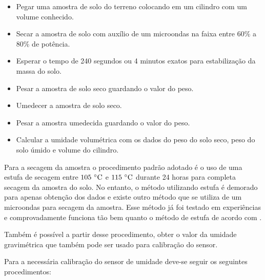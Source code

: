 		\begin{itemize}
			\item Pegar uma amostra de solo do terreno colocando em um cilindro com um volume conhecido.
			\item Secar a amostra de solo com auxílio de um microondas na faixa entre 60\% a 80\% de potência.
			\item Esperar o tempo de 240 segundos ou 4 minutos exatos para estabilização da massa do solo.
			\item Pesar a amostra de solo seco guardando o valor do peso.
			\item Umedecer a amostra de solo seco.
			\item Pesar a amostra umedecida guardando o valor do peso.
			\item Calcular a umidade volumétrica com os dados do peso do solo seco, peso do solo úmido e volume do cilindro.
		\end{itemize}

		Para a secagem da amostra o procedimento padrão adotado é o uso de uma estufa de
		secagem entre $105~\celsius$ e $115~\celsius$ durante 24 horas para completa secagem da
		amostra do solo. No entanto, o método utilizando estufa é demorado para apenas
		obtenção dos dados e existe outro método que se utiliza de um microondas para
		secagem da amostra. Esse método já foi testado em experiências e comprovadamente
		funciona tão bem quanto o método de estufa de acordo com .

		Também é possível a partir desse procedimento, obter o valor da umidade gravimétrica
		que também pode ser usado para calibração do sensor.

		Para a necessária calibração do sensor de umidade deve-se seguir os seguintes procedimentos:

